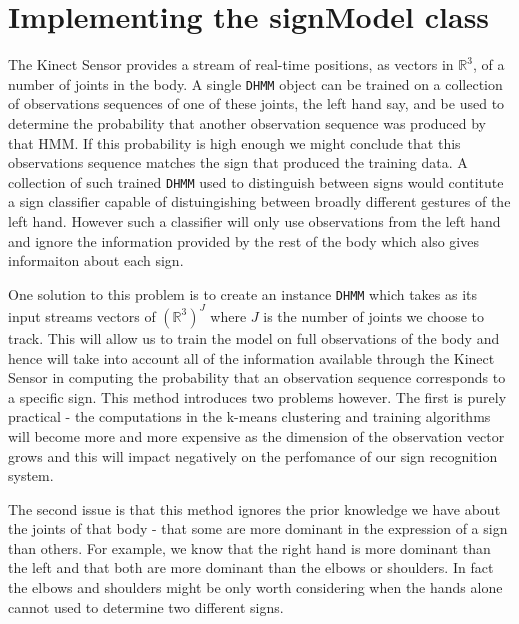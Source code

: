 \section{Implementing the signModel class}
The Kinect Sensor provides a stream of real-time positions, as vectors in $\mathbb{R}^3$, of a number of joints in the body. A single \verb|DHMM| object can be trained on a collection of observations sequences of one of these joints, the left hand say, and be used to determine the probability that another observation sequence was produced by that HMM. If this probability is high enough we might conclude that this observations sequence matches the sign that produced the training data. A collection of such trained \verb|DHMM| used to distinguish between signs would contitute a sign classifier capable of distuingishing between broadly different gestures of the left hand. However such a classifier will only use observations from the left hand and ignore the information provided by the rest of the body which also gives informaiton about each sign.

One solution to this problem is to create an instance \verb|DHMM| which takes as its input streams vectors of $(\mathbb{R}^3)^J$ where $J$ is the number of joints we choose to track. This will allow us to train the model on full observations of the body and hence will take into account all of the information available through the Kinect Sensor in computing the probability that an observation sequence corresponds to a specific sign. This method introduces two problems however. The first is purely practical - the computations in the k-means clustering and training algorithms will become more and more expensive as the dimension of the observation vector grows and this will impact negatively on the perfomance of our sign recognition system.

The second issue is that this method ignores the prior knowledge we have about the joints of that body - that some are more dominant in the expression of a sign than others. For example, we know that the right hand is more dominant than the left and that both are more dominant than the elbows or shoulders. In fact the elbows and shoulders might be only worth considering when the hands alone cannot used to determine two different signs.

